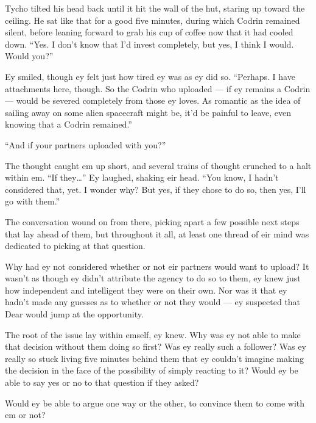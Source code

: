 Tycho tilted his head back until it hit the wall of the hut, staring up toward the ceiling. He sat like that for a good five minutes, during which Codrin remained silent, before leaning forward to grab his cup of coffee now that it had cooled down. ``Yes. I don't know that I'd invest completely, but yes, I think I would. Would you?''

Ey smiled, though ey felt just how tired ey was as ey did so. ``Perhaps. I have attachments here, though. So the Codrin who uploaded — if ey remains a Codrin — would be severed completely from those ey loves. As romantic as the idea of sailing away on some alien spacecraft might be, it'd be painful to leave, even knowing that a Codrin remained.''

``And if your partners uploaded with you?''

The thought caught em up short, and several trains of thought crunched to a halt within em. ``If they\ldots{}'' Ey laughed, shaking eir head. ``You know, I hadn't considered that, yet. I wonder why? But yes, if they chose to do so, then yes, I'll go with them.''

The conversation wound on from there, picking apart a few possible next steps that lay ahead of them, but throughout it all, at least one thread of eir mind was dedicated to picking at that question.

Why had ey not considered whether or not eir partners would want to upload? It wasn't as though ey didn't attribute the agency to do so to them, ey knew just how independent and intelligent they were on their own. Nor was it that ey hadn't made any guesses as to whether or not they would — ey suspected that Dear would jump at the opportunity.

The root of the issue lay within emself, ey knew. Why was ey not able to make that decision without them doing so first? Was ey really such a follower? Was ey really so stuck living five minutes behind them that ey couldn't imagine making the decision in the face of the possibility of simply reacting to it? Would ey be able to say yes or no to that question if they asked?

Would ey be able to argue one way or the other, to convince them to come with em or not?
